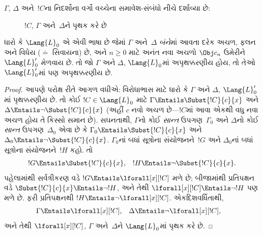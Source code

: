 $\Gamma$, $\Delta$ અને~$!C$ના નિદર્શોના વર્ગો વચ્ચેના સમાવેશ-સંબંધો
નીચે દર્શાવ્યા છે:
\begin{figure}[h]
  \centering
  \caption{$!C$, $\Gamma$ અને~$\Delta$ને પૃથક કરે છે}
\end{figure}


\begin{lem}
ધારો કે $\Lang{L}_0$ એ એવી ભાષા છે જેમાં $\Gamma$ અને~$\Delta$
\emph{બંને}માં આવતા દરેક અચળ, ફલન અને વિધેય
($\doteq$ સિવાયના) છે, અને $n\ge 0$ માટે અનંત નવા અચળો
$\Obj c_n$ ઉમેરીને $\Lang{L}'_0$ મેળવાય છે. તો જો $\Gamma$ અને
$\Delta$, $\Lang{L}_0$માં અપૃથક્કરણીય હોય, તો તેઓ $\Lang{L}'_0$માં
પણ અપૃથક્કરણીય છે.
\end{lem}

\begin{proof}
આપણે પરોક્ષ રીતે આગળ વધીએ: વિરોધાભાસ માટે ધારો કે $\Gamma$ અને
$\Delta$, $\Lang{L}'_0$માં પૃથક્કરણીય છે. તો કોઈ $!C\in\Lang{L}_0$
માટે $\Gamma \Entails \Subst{!C}{c}{x}$ અને $\Delta \Entails \lnot
\Subst{!C}{c}{x}$ (અહીં $c$ નવો અચળ છે---$!C$માં આવા એકથી
વધુ નવા અચળ હોય તે કિસ્સો સમાન છે). સઘનતાથી, $\Gamma$નો
કોઈ \emph{સાન્ત} ઉપગણ~$\Gamma_0$ અને $\Delta$નો કોઈ \emph{સાન્ત}
ઉપગણ~$\Delta_0$ એવા છે કે $\Gamma_0 \Entails \Subst{!C}{c}{x}$ અને
$\Delta_0 \Entails \lnot \Subst{!C}{c}{x}$. $\Gamma_0$નાં બધાં
સૂત્રોના સંયોજનને~$!G$ અને $\Delta_0$નાં બધાં સૂત્રોના
સંયોજનને~$!H$ કહો. તો
\begin{align*}
  !G & \Entails \Subst{!C}{c}{x}, & !H  \Entails \lnot \Subst{!C}{c}{x}.
\end{align*}
પહેલામાંથી સર્વત્રીકરણ વડે $!G \Entails \lforall[x][!C]$ મળે છે;
બીજામાંથી પ્રતિપક્ષન વડે $\Subst{!C}{c}{x} \Entails \lnot !H$, અને
તેથી $\lforall[x][!C] \Entails \lnot !H$ પણ મળે છે. ફરી પ્રતિપક્ષનથી
$!H \Entails \lnot \lforall[x][!C]$. એકદિશવર્ધિતાથી,
\begin{align*}
  \Gamma &\Entails \lforall[x][!C], &
  \Delta & \Entails \lnot \lforall[x][!C],
\end{align*}
અને તેથી $\lforall[x][!C]$, $\Gamma$ અને~$\Delta$ને $\Lang{L}_0$માં
પૃથક કરે છે.
\end{proof}

